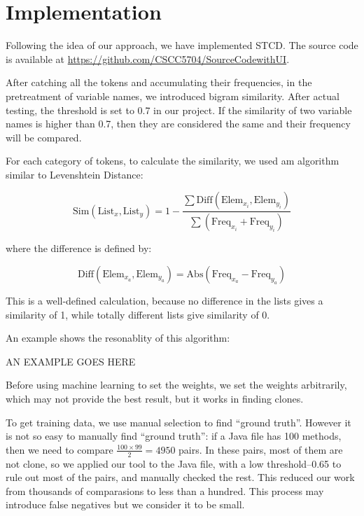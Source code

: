 \documentclass[../main.tex]{subfiles}
\begin{document}
\section{Implementation}

Following the idea of our approach, we have implemented STCD. The source code is available at {\color{blue} \url{https://github.com/CSCC5704/SourceCodewithUI}}.

After catching all the tokens and accumulating their frequencies, in the pretreatment of variable names, we introduced bigram similarity. After actual testing, the threshold is set to 0.7 in our project. If the similarity of two variable names is higher than 0.7, then they are considered the same and their frequency will be compared.

For each category of tokens, to calculate the similarity, we used am algorithm similar to Levenshtein Distance:

\begin{equation}
\text{Sim}(\text{List}_x, \text{List}_y) = 1 - \frac{\sum \text{Diff}(\text{Elem}_{x_i}, \text{Elem}_{y_i})} {\sum (\text{Freq}_{x_i} + \text{Freq}_{y_i} )}
\end{equation}

where the difference is defined by:

\begin{equation}
\text{Diff}(\text{Elem}_{x_a}, \text{Elem}_{y_a}) = \text{Abs}(\text{Freq}_{x_a} - \text{Freq}_{y_a})
\end{equation}

This is a well-defined calculation, because no difference in the lists gives a similarity of 1, while totally different lists give similarity of 0.

An example shows the resonablity of this algorithm:

AN EXAMPLE GOES HERE

Before using machine learning to set the weights, we set the weights arbitrarily, which may not provide the best result, but it works in finding clones. 

To get training data, we use manual selection to find ``ground truth''. However it is not so easy to manually find ``ground truth'': if a Java file has 100 methods, then we need to compare $\frac{100\times 99}{2} = 4950$ pairs. In these pairs, most of them are not clone, so we applied our tool to the Java file, with a low threshold--0.65 to rule out most of the pairs, and manually checked the rest. This reduced our work from thousands of comparasions to less than a hundred. This process may introduce false negatives but we consider it to be small.
\end{document}
